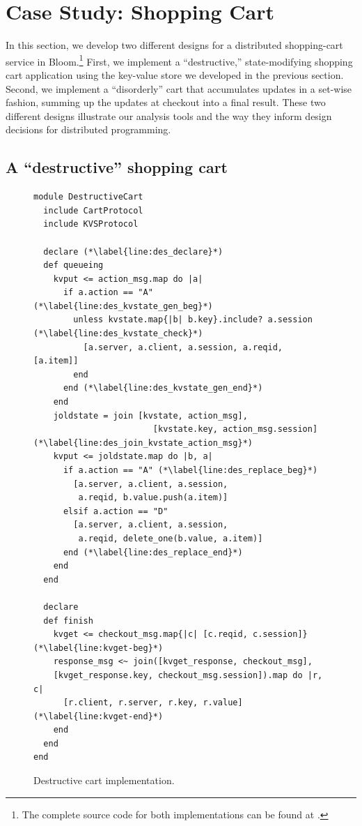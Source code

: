 \section{Case Study: Shopping Cart}
\label{sec:case}
In this section, we develop two different designs for a distributed
shopping-cart service in Bloom.\footnote{The complete source code for both
  implementations can be found at
  .}  First, we
implement a ``destructive,'' state-modifying shopping cart application using the
key-value store we developed in the previous section.  Second, we implement a
``disorderly'' cart that accumulates updates in a set-wise fashion, summing up
the updates at checkout into a final result.  These two different designs
illustrate our analysis tools and the way they inform design decisions for
distributed programming.

\subsection{A ``destructive'' shopping cart}

\begin{figure}[t]
\begin{scriptsize}
\begin{lstlisting}
module DestructiveCart
  include CartProtocol
  include KVSProtocol

  declare (*\label{line:des_declare}*)
  def queueing
    kvput <= action_msg.map do |a|
      if a.action == "A" (*\label{line:des_kvstate_gen_beg}*)
        unless kvstate.map{|b| b.key}.include? a.session (*\label{line:des_kvstate_check}*)
          [a.server, a.client, a.session, a.reqid, [a.item]]
        end
      end (*\label{line:des_kvstate_gen_end}*)
    end
    joldstate = join [kvstate, action_msg],
                        [kvstate.key, action_msg.session]  (*\label{line:des_join_kvstate_action_msg}*)
    kvput <= joldstate.map do |b, a|
      if a.action == "A" (*\label{line:des_replace_beg}*)
        [a.server, a.client, a.session, 
         a.reqid, b.value.push(a.item)]
      elsif a.action == "D"
        [a.server, a.client, a.session, 
         a.reqid, delete_one(b.value, a.item)]
      end (*\label{line:des_replace_end}*)
    end
  end

  declare
  def finish
    kvget <= checkout_msg.map{|c| [c.reqid, c.session]} (*\label{line:kvget-beg}*)
    response_msg <~ join([kvget_response, checkout_msg],
    [kvget_response.key, checkout_msg.session]).map do |r, c|
      [r.client, r.server, r.key, r.value] (*\label{line:kvget-end}*)
    end
  end
end
\end{lstlisting}
\vspace{-10pt}
\caption{Destructive cart implementation.}
\label{fig:dest-cart}
\end{scriptsize}
\vspace{-2pt}
\end{figure}

